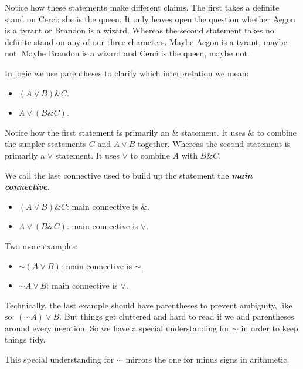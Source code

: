 \documentclass[justified]{tufte-book}
\providecommand{\tightlist}{%
  \setlength{\itemsep}{0pt}\setlength{\parskip}{0pt}}
\renewcommand{\neg}{\mathbin{\sim}}
\renewcommand{\wedge}{\mathbin{\&}}
\theoremstyle{definition}
\theoremstyle{definition}
\theoremstyle{definition}
\theoremstyle{definition}
\theoremstyle{remark}
\begin{document}
Notice how these statements make different claims. The first takes a definite stand on Cerci: she is the queen. It only leaves open the question whether Aegon is a tyrant or Brandon is a wizard. Whereas the second statement takes no definite stand on any of our three characters. Maybe Aegon is a tyrant, maybe not. Maybe Brandon is a wizard and Cerci is the queen, maybe not.

In logic we use parentheses to clarify which interpretation we mean:

\begin{itemize}
\tightlist
\item
  \((A \vee B) \wedge C\).
\item
  \(A \vee (B \wedge C)\).
\end{itemize}

Notice how the first statement is primarily an \(\wedge\) statement. It uses \(\wedge\) to combine the simpler statements \(C\) and \(A \vee B\) together. Whereas the second statement is primarily a \(\vee\) statement. It uses \(\vee\) to combine \(A\) with \(B \wedge C\).

We call the last connective used to build up the statement the \textbf{\emph{main connective}}.

\begin{itemize}
\tightlist
\item
  \((A \vee B) \wedge C\): main connective is \(\wedge\).
\item
  \(A \vee (B \wedge C)\): main connective is \(\vee\).
\end{itemize}

Two more examples:

\begin{itemize}
\tightlist
\item
  \(\neg (A \vee B)\): main connective is \(\neg\).
\item
  \(\neg A \vee B\): main connective is \(\vee\).
\end{itemize}

Technically, the last example should have parentheses to prevent ambiguity, like so: \((\neg A) \vee B\). But things get cluttered and hard to read if we add parentheses around every negation. So we have a special understanding for \(\neg\) in order to keep things tidy.

\begin{marginfigure}
This special understanding for \(\mathbin{\sim}\) mirrors the one for
minus signs in arithmetic.
\end{marginfigure}
\end{document}
